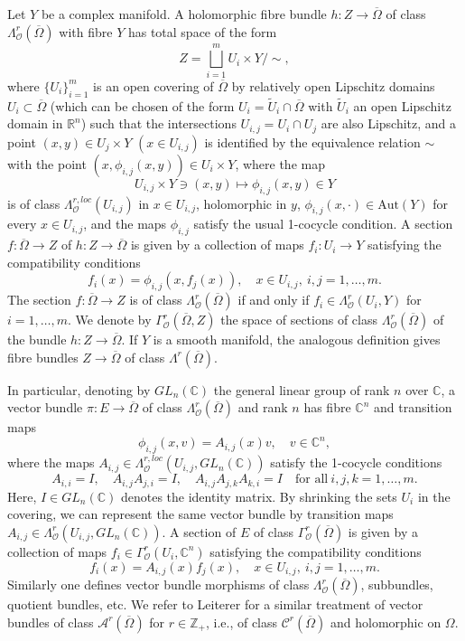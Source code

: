 \documentclass[11pt]{amsart}
\numberwithin{equation}{section}
\theoremstyle{definition}
\newcommand\Ascr{\mathscr{A}}
\newcommand\Cscr{\mathscr{C}}
\newcommand\Oscr{\mathscr{O}}
\newcommand\C{\mathbb{C}}
\newcommand\R{\mathbb{R}}
\newcommand\Z{\mathbb{Z}}
\newcommand\wt{\widetilde}
\newcommand\Aut{\mathrm{Aut}}
\begin{document}
Let $Y$ be a complex manifold. 
A holomorphic fibre bundle $h:Z\to \overline\Omega$ 
of class $\Lambda^r_\Oscr(\overline \Omega)$ with fibre $Y$  
has total space of the form 
\[
	Z= \bigsqcup_{i=1}^m U_i \times Y/\!\!\sim, 
\]  
where $\{U_i\}_{i=1}^m$ is an open covering of 
$\overline \Omega$ by relatively open Lipschitz domains  
$U_i\subset \overline \Omega$ (which can be chosen of
the form $U_i=\wt U_i\cap \overline \Omega$ with 
$\wt U_i$ an open Lipschitz domain in $\R^n$)
such that the intersections 
$U_{i,j}=U_i\cap U_j$ are also Lipschitz, and a point 
$(x,y)\in U_j \times Y$ $(x\in U_{i,j})$ 
is identified by the equivalence relation $\sim$ with the point
$(x,\phi_{i,j}(x,y))\in U_i\times Y$, where the map 
\[
	U_{i,j} \times Y \ni (x,y) \mapsto \phi_{i,j}(x,y)\in Y
\] 
is of class $\Lambda^{r,loc}_\Oscr(U_{i,j})$ in $x\in U_{i,j}$,
holomorphic in $y$, $\phi_{i,j}(x,\cdotp)\in \Aut(Y)$ 
for every $x\in U_{i,j}$, and the maps $\phi_{i,j}$ satisfy the usual
1-cocycle condition. 
A section $f:\overline \Omega\to Z$ of $h:Z\to \overline\Omega$ 
is given by a collection of maps $f_i:U_i\to Y$ satisfying the 
compatibility conditions
\[
	f_i(x) = \phi_{i,j}(x, f_j(x)),\quad x\in U_{i,j},\ i,j=1,\ldots,m.
\]
The section $f:\overline \Omega\to Z$ is of class 
$\Lambda^r_\Oscr(\overline \Omega)$ if and
only if $f_i\in \Lambda^r_\Oscr(U_i,Y)$ for $i=1,\ldots,m$. 
We denote by $\Gamma^r_\Oscr(\overline \Omega,Z)$ the space 
of sections of class $\Lambda^r_\Oscr(\overline \Omega)$
of the bundle $h:Z\to\overline\Omega$.
If $Y$ is a smooth manifold, the analogous definition gives
fibre bundles $Z\to \overline\Omega$ of class $\Lambda^r(\overline\Omega)$.

In particular, denoting by $GL_n(\C)$ the general linear group 
of rank $n$ over $\C$, a vector bundle $\pi:E\to\overline \Omega$
of class $\Lambda^r_\Oscr(\overline \Omega)$ and rank $n$
has fibre $\C^n$ and transition maps 
\[
	\phi_{i,j}(x,v)=A_{i,j}(x)v, \quad v\in\C^n,
\]
where the maps $A_{i,j}\in \Lambda^{r,loc}_\Oscr(U_{i,j},GL_n(\C))$
satisfy the 1-cocycle conditions
\[
	A_{i,i}=I,\quad A_{i,j}A_{j,i}=I,\quad 
	A_{i,j}A_{j,k}A_{k,i}=I\quad \text{for all}\ i,j,k=1,\ldots,m.
\]
Here, $I\in GL_n(\C)$ denotes the identity matrix.
By shrinking the sets $U_i$ in the covering, we can represent the same
vector bundle by transition maps 
$A_{i,j}\in \Lambda^{r}_\Oscr(U_{i,j},GL_n(\C))$.
A section of $E$ of class $\Gamma^r_\Oscr(\overline\Omega)$ 
is given by a collection of maps $f_i\in \Gamma^r_\Oscr(U_i,\C^n)$ 
satisfying the compatibility conditions
\[
	f_i(x) = A_{i,j}(x) f_j(x),\quad x\in U_{i,j},\ i,j=1,\ldots,m.
\]
Similarly one defines vector bundle morphisms of class 
$\Lambda^r_\Oscr(\overline \Omega)$, 
subbundles, quotient bundles, etc. 
We refer to Leiterer \cite{Leiterer1990} for a similar treatment of
vector bundles of class $\Ascr^r(\overline \Omega)$ 
for $r\in \Z_+$, i.e., of class $\Cscr^r(\overline \Omega)$ and
holomorphic on $\Omega$.
\end{document}
